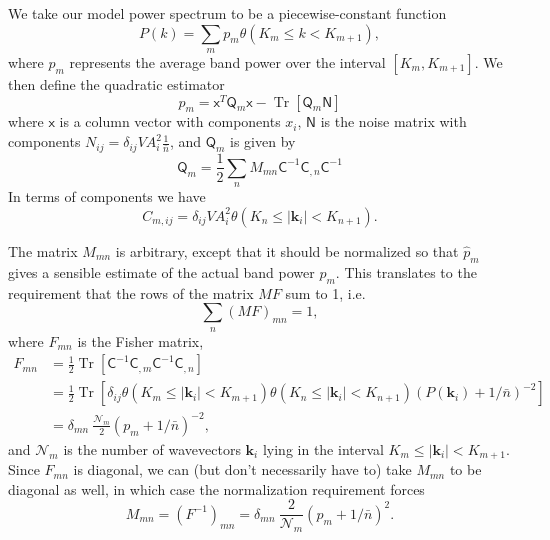 \documentclass{article}
\renewcommand{\vec}[1]{\bm{#1}}
\newcommand{\mat}[1]{\textsf{#1}}
\newcommand{\nbar}{\bar{n}}
\DeclareMathOperator{\Tr}{Tr}
\begin{document}
We take our model power spectrum to be a piecewise-constant function
\begin{equation}
    P(k) = \sum_m p_m \theta(K_m \le k < K_{m+1}),
\end{equation}
where $p_m$ represents the average band power over the interval
$[K_m,K_{m+1}]$.  We then define the quadratic estimator
\begin{equation}
    \hat{p}_m = \mat{x}^T \mat{Q}_m \mat{x} - \Tr[\mat{Q}_m \mat{N}]
\end{equation}
where $\mat{x}$ is a column vector with components $x_i$, $\mat{N}$ is the
noise matrix with components $N_{ij} = \delta_{ij} V A_i^2 \frac{1}{\nbar}$,
and $\mat{Q}_m$ is given by
\begin{equation}
    \mat{Q}_m = \frac{1}{2} \sum_n M_{mn} \mat{C}^{-1} \mat{C}_{,n} \mat{C}^{-1}
\end{equation}
In terms of components we have
\begin{equation}
    C_{m,ij} = \delta_{ij} V A_i^2 \theta(K_n \le |\vec{k}_i| < K_{n+1}).
\end{equation}

The matrix $M_{mn}$ is arbitrary, except that it should be normalized so that
$\hat{p}_m$ gives a sensible estimate of the actual band power $p_m$.  This
translates to the requirement that the rows of the matrix $MF$ sum to 1, i.e.
\begin{equation}
    \sum_n (M F)_{mn} = 1,
\end{equation}
where $F_{mn}$ is the Fisher matrix,
\begin{align}
    F_{mn} &= \frac{1}{2} \Tr[\mat{C}^{-1} \mat{C}_{,m} \mat{C}^{-1} \mat{C}_{,n}] \\
        &= \frac{1}{2} \Tr\left[ \delta_{ij} \theta(K_m \le |\vec{k}_i| < K_{m+1}) \theta(K_n \le |\vec{k}_i| < K_{n+1}) \left(P(\vec{k}_i) + 1/\nbar\right)^{-2} \right] \\
        &= \delta_{mn}~ \frac{\mathcal{N}_m}{2} \left(p_m + 1/\nbar \right)^{-2},
\end{align}
and $\mathcal{N}_m$ is the number of wavevectors $\vec{k}_i$ lying in the
interval $K_m \le |\vec{k}_i| < K_{m+1}$.  Since $F_{mn}$ is diagonal, we can
(but don't necessarily have to) take $M_{mn}$ to be diagonal as well, in which
case the normalization requirement forces
\begin{equation}
    M_{mn} = (F^{-1})_{mn} = \delta_{mn}~ \frac{2}{\mathcal{N}_m} \left(p_m + 1/\nbar \right)^2 .
\end{equation}
\end{document}
